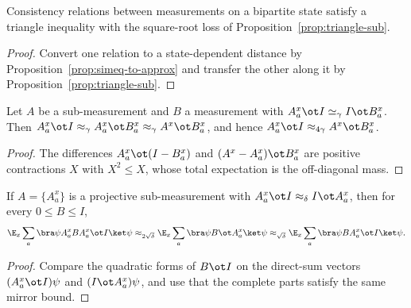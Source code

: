 \begin{proposition}\label{prop:simeq-triangle-inequality}
	\leanok
	Consistency relations between measurements on a bipartite state satisfy
	a triangle inequality with the square-root loss of
	Proposition~\ref{prop:triangle-sub}.
\end{proposition}
\begin{proof}
	\leanok
	Convert one relation to a state-dependent distance by
	Proposition~\ref{prop:simeq-to-approx} and transfer the other along it by
	Proposition~\ref{prop:triangle-sub}.
\end{proof}

\begin{proposition}\label{prop:cons-sub-meas}
	\leanok
	Let $A$ be a sub-measurement and $B$ a measurement with
	$A^x_a\ot I\simeq_\gamma I\ot B^x_a$.  Then
	$A^x_a\ot I\approx_\gamma A^x_a\ot B^x_a\approx_\gamma A^x\ot B^x_a$, and
	hence $A^x_a\ot I\approx_{4\gamma}A^x\ot B^x_a$.
\end{proposition}
\begin{proof}
	\leanok
	The differences $A^x_a\ot(I-B^x_a)$ and $(A^x-A^x_a)\ot B^x_a$ are
	positive contractions $X$ with $X^2\le X$, whose total expectation is the
	off-diagonal mass.
\end{proof}

\begin{proposition}\label{prop:switch-sandwich}
	\leanok
	If $A=\{A^x_a\}$ is a projective sub-measurement with
	$A^x_a\ot I\approx_\delta I\ot A^x_a$, then for every $0\le B\le I$,
	\[
		\E_x\sum_a\bra\psi A^x_aBA^x_a\ot I\ket\psi
		\approx_{2\sqrt\delta}
		\E_x\sum_a\bra\psi B\ot A^x_a\ket\psi
		\approx_{\sqrt\delta}
		\E_x\sum_a\bra\psi BA^x_a\ot I\ket\psi.
	\]
\end{proposition}
\begin{proof}
	\leanok
	Compare the quadratic forms of $B\ot I$ on the direct-sum vectors
	$(A^x_a\ot I)\psi$ and $(I\ot A^x_a)\psi$, and use that the complete parts
	satisfy the same mirror bound.
\end{proof}

